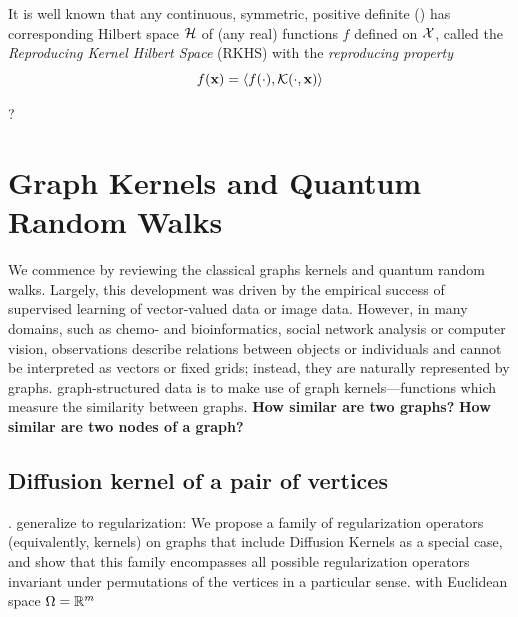 \begin{definition}\label{def:rkhs}
	It is well known that any continuous, symmetric, positive definite () has corresponding Hilbert space $\mathcal{H}$ of (any real) functions $f$ defined on $\mathcal{X}$, 
	called the \emph{Reproducing Kernel Hilbert Space} (RKHS) with the \emph{reproducing property}
	\begin{equation}
		f(\vb{x}) = \expval{f(\cdot),\mathcal{K}(\cdot,\vb{x})}
	\end{equation}
\end{definition}
\begin{theorem}
	?
\end{theorem}

\section{Graph Kernels and Quantum Random Walks}
We commence by reviewing the classical graphs kernels and quantum random walks.
Largely, this development was driven by the empirical success of supervised learning of vector-valued data or image data. However, in many domains, such as chemo- and bioinformatics, social network analysis or computer vision, observations describe relations between objects or individuals and cannot be interpreted as vectors or fixed grids; instead, they are naturally represented by graphs.
\cite{kriegeSurveyGraphKernels2020}
graph-structured data is to make use of graph kernels—functions which measure the similarity between graphs.
\textbf{How similar are two graphs?}
\textbf{How similar are two nodes of a graph?}

\subsection{Diffusion kernel of a pair of vertices}
\cite{kondorDiffusionKernelsGraphs2002}.
generalize to regularization: 
We propose a family of regularization operators (equivalently, kernels) on graphs that include Diffusion Kernels as a special case, and show that this family encompasses all possible regularization operators invariant under permutations of the vertices in a particular sense.
\cite{smolaKernelsRegularizationGraphs2003}
with Euclidean space $\Omega = \mathbb{R}^m$

